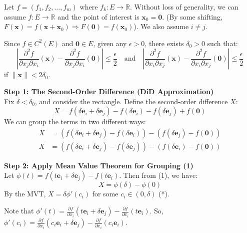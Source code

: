 \documentclass[12pt]{article}
\begin{document}
\begin{dbox}
\begin{pf}
Let $f = (f_1, f_2, \dots, f_m)$ where $f_k: E \to \mathbb{R}$. Without loss of generality, we can assume $f: E \to \mathbb{R}$ and the point of interest is $\mathbf{x}_0 = \mathbf{0}$. (By some shifting, $F(\mathbf{x}) = f(\mathbf{x} + \mathbf{x}_0) \Rightarrow F(\mathbf{0}) = f(\mathbf{x}_0)$). We also assume $i \neq j$.

Since $f \in C^2(E)$ and $\mathbf{0} \in E$, given any $\epsilon > 0$, there exists $\delta_0 > 0$ such that:
$$ \left| \frac{\partial^2 f}{\partial x_j \partial x_i}(\mathbf{x}) - \frac{\partial^2 f}{\partial x_j \partial x_i}(\mathbf{0}) \right| \le \frac{\epsilon}{2} \quad \text{and} \quad \left| \frac{\partial^2 f}{\partial x_i \partial x_j}(\mathbf{x}) - \frac{\partial^2 f}{\partial x_i \partial x_j}(\mathbf{0}) \right| \le \frac{\epsilon}{2} $$
if $\|\mathbf{x}\| < 2\delta_0$.

\vspace{0.8em}
\noindent \textbf{Step 1: The Second-Order Difference (DiD Approximation)}\\
Fix $\delta < \delta_0$, and consider the rectangle. Define the second-order difference $X$:
$$ X = f(\delta \mathbf{e}_i + \delta \mathbf{e}_j) - f(\delta \mathbf{e}_i) - f(\delta \mathbf{e}_j) + f(\mathbf{0}) $$
We can group the terms in two different ways:
\begin{align}
X &= \left( f(\delta \mathbf{e}_i + \delta \mathbf{e}_j) - f(\delta \mathbf{e}_i) \right) - \left( f(\delta \mathbf{e}_j) - f(\mathbf{0}) \right) \tag{1} \\
X &= \left( f(\delta \mathbf{e}_i + \delta \mathbf{e}_j) - f(\delta \mathbf{e}_j) \right) - \left( f(\delta \mathbf{e}_i) - f(\mathbf{0}) \right) \tag{2}
\end{align}

\vspace{0.8em}
\noindent \textbf{Step 2: Apply Mean Value Theorem for Grouping (1)}\\
Let $\phi(t) = f(t \mathbf{e}_i + \delta \mathbf{e}_j) - f(t \mathbf{e}_i)$. Then from (1), we have:
$$ X = \phi(\delta) - \phi(0) $$
By the MVT, $X = \delta \phi'(c_i)$ for some $c_i \in (0, \delta)$ \quad (*).

Note that $\phi'(t) = \frac{\partial f}{\partial x_i}(t \mathbf{e}_i + \delta \mathbf{e}_j) - \frac{\partial f}{\partial x_i}(t \mathbf{e}_i)$.
So, $\phi'(c_i) = \frac{\partial f}{\partial x_i}(c_i \mathbf{e}_i + \delta \mathbf{e}_j) - \frac{\partial f}{\partial x_i}(c_i \mathbf{e}_i)$.


\end{pf}
\end{dbox}
\end{document}
